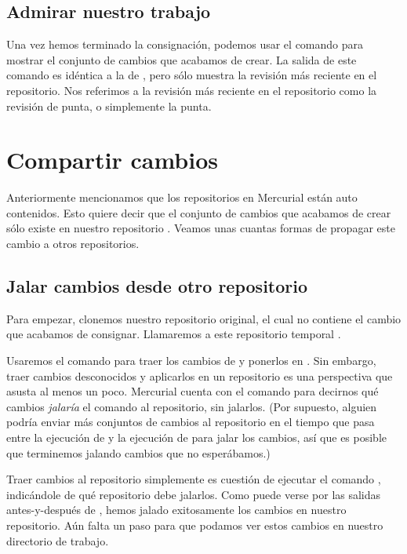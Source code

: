 \subsection{Admirar nuestro trabajo}

Una vez hemos terminado la consignación, podemos usar el comando
 para mostrar el conjunto de cambios que acabamos de crear.
La salida de este comando es idéntica a la de , pero sólo
muestra la revisión más reciente en el repositorio.
Nos referimos a la revisión más reciente en el repositorio como la
revisión de punta, o simplemente la punta.

\section{Compartir cambios}

Anteriormente mencionamos que los repositorios en Mercurial están auto
contenidos. Esto quiere decir que el conjunto de cambios que acabamos
de crear sólo existe en nuestro repositorio . Veamos
unas cuantas formas de propagar este cambio a otros repositorios.

\subsection{Jalar cambios desde otro repositorio}
\label{sec:tour:pull}

Para empezar, clonemos nuestro repositorio  original,
el cual no contiene el cambio que acabamos de consignar. Llamaremos a
este repositorio temporal .

Usaremos el comando  para traer los cambios de
 y ponerlos en .  Sin embargo,
traer cambios desconocidos y aplicarlos en un repositorio es una
perspectiva que asusta al menos un poco.  Mercurial cuenta con el
comando  para
decirnos qué cambios \emph{jalaría} el comando  al
repositorio, sin jalarlos.
(Por supuesto, alguien podría enviar más conjuntos de cambios al
repositorio en el tiempo que pasa entre la ejecución de
 y la ejecución de  para jalar los
cambios, así que es posible que terminemos jalando cambios que no
esperábamos.)

Traer cambios al repositorio simplemente es cuestión de ejecutar el
comando , indicándole de qué repositorio debe jalarlos.
Como puede verse por las salidas antes-y-después de , hemos
jalado exitosamente los cambios en nuestro repositorio. Aún falta un
paso para que podamos ver estos cambios en nuestro directorio de
trabajo.

